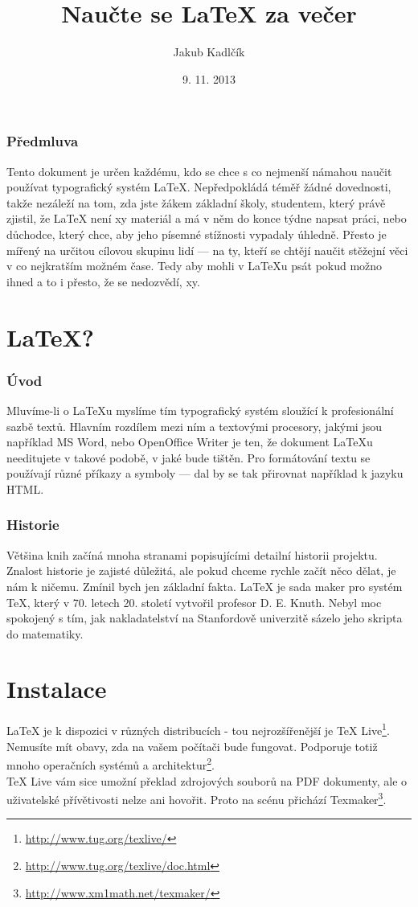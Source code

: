 \documentclass[10pt,a4paper]{article}
\title{Naučte se \LaTeX{} za večer}
\author{Jakub Kadlčík}
\date{9. 11. 2013}
\begin{document}
	\maketitle
	\newpage

	\section*{Předmluva}
	Tento dokument je určen každému, kdo se chce s co nejmenší námahou naučit používat typografický systém LaTeX. Nepředpokládá téměř žádné dovednosti, takže nezáleží na tom, zda jste žákem základní školy, studentem, který právě zjistil, že LaTeX není xy materiál a má v něm do konce týdne napsat práci, nebo důchodce, který chce, aby jeho písemné stížnosti vypadaly úhledně.
	Přesto je mířený na určitou cílovou skupinu lidí --- na ty, kteří se chtějí naučit stěžejní věci v co nejkratším možném čase. Tedy aby mohli v LaTeXu psát pokud možno ihned a to i přesto, že se nedozvědí, xy.

	\newpage
	\tableofcontents
	\newpage	
	\setcounter{page}{4}
    \part{LaTeX?}
		\section{Úvod}
		Mluvíme-li o LaTeXu myslíme tím typografický systém sloužící k profesionální sazbě textů. Hlavním rozdílem mezi ním a textovými procesory, jakými jsou například MS Word, nebo OpenOffice Writer je ten, že dokument LaTeXu needitujete v takové podobě, v jaké bude tištěn. Pro formátování textu se používají různé příkazy a symboly --- dal by se tak přirovnat například k jazyku HTML.

		\section{Historie}
		Většina knih začíná mnoha stranami popisujícími detailní historii projektu. Znalost historie je zajisté důležitá, ale pokud chceme rychle začít něco dělat, je nám k ničemu. Zmínil bych jen základní fakta. LaTeX je sada maker pro systém TeX, který v 70. letech 20. století vytvořil profesor D. E. Knuth. Nebyl moc spokojený s tím, jak nakladatelství na  Stanfordově univerzitě sázelo jeho skripta do matematiky.

	\newpage
	\part{Instalace}
		LaTeX je k dispozici v různých distribucích - tou nejrozšířenější je TeX Live\footnote{\url{http://www.tug.org/texlive/}}. Nemusíte mít obavy, zda na vašem počítači bude fungovat. Podporuje totiž mnoho operačních systémů a architektur\footnote{\url{http://www.tug.org/texlive/doc.html}}.
		\\
		TeX Live vám sice umožní překlad zdrojových souborů na PDF dokumenty, ale o uživatelské přívětivosti nelze ani hovořit. Proto na scénu přichází Texmaker\footnote{\url{http://www.xm1math.net/texmaker/}}.
\end{document}

